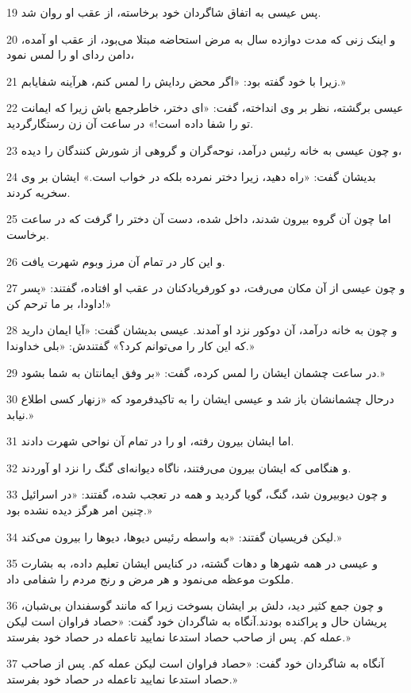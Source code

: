 \par 19 پس عیسی به اتفاق شاگردان خود برخاسته، از عقب او روان شد.
\par 20 و اینک زنی که مدت دوازده سال به مرض استحاضه مبتلا می‌بود، از عقب او آمده، دامن ردای او را لمس نمود،
\par 21 زیرا با خود گفته بود: «اگر محض ردایش را لمس کنم، هرآینه شفایابم.»
\par 22 عیسی برگشته، نظر بر وی انداخته، گفت: «ای دختر، خاطرجمع باش زیرا که ایمانت تو را شفا داده است!» در ساعت آن زن رستگارگردید.
\par 23 و چون عیسی به خانه رئیس در‌آمد، نوحه‌گران و گروهی از شورش کنندگان را دیده،
\par 24 بدیشان گفت: «راه دهید، زیرا دختر نمرده بلکه در خواب است.» ایشان بر وی سخریه کردند.
\par 25 اما چون آن گروه بیرون شدند، داخل شده، دست آن دختر را گرفت که در ساعت برخاست.
\par 26 و این کار در تمام آن مرز وبوم شهرت یافت.
\par 27 و چون عیسی از آن مکان می‌رفت، دو کورفریاد‌کنان در عقب او افتاده، گفتند: «پسر داودا، بر ما ترحم کن!»
\par 28 و چون به خانه در‌آمد، آن دوکور نزد او آمدند. عیسی بدیشان گفت: «آیا ایمان دارید که این کار را می‌توانم کرد؟» گفتندش: «بلی خداوندا.»
\par 29 در ساعت چشمان ایشان را لمس کرده، گفت: «بر وفق ایمانتان به شما بشود.»
\par 30 درحال چشمانشان باز شد و عیسی ایشان را به تاکیدفرمود که «زنهار کسی اطلاع نیابد.»
\par 31 اما ایشان بیرون رفته، او را در تمام آن نواحی شهرت دادند.
\par 32 و هنگامی که ایشان بیرون می‌رفتند، ناگاه دیوانه‌ای گنگ را نزد او آوردند.
\par 33 و چون دیوبیرون شد، گنگ، گویا گردید و همه در تعجب شده، گفتند: «در اسرائیل چنین امر هرگز دیده نشده بود.»
\par 34 لیکن فریسیان گفتند: «به واسطه رئیس دیوها، دیوها را بیرون می‌کند.»
\par 35 و عیسی در همه شهرها و دهات گشته، در کنایس ایشان تعلیم داده، به بشارت ملکوت موعظه می‌نمود و هر مرض و رنج مردم را شفامی داد.
\par 36 و چون جمع کثیر دید، دلش بر ایشان بسوخت زیرا که مانند گوسفندان بی‌شبان، پریشان حال و پراکنده بودند.آنگاه به شاگردان خود گفت: «حصاد فراوان است لیکن عمله کم. پس از صاحب حصاد استدعا نمایید تاعمله در حصاد خود بفرستد.»
\par 37 آنگاه به شاگردان خود گفت: «حصاد فراوان است لیکن عمله کم. پس از صاحب حصاد استدعا نمایید تاعمله در حصاد خود بفرستد.»

